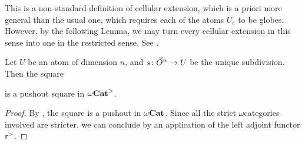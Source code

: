 \begin{comm}
    This is a non-standard definition of cellular extension, which is a priori more general than the usual one, which requires each of the atoms \( U_e \) to be globes.
    However, by the following Lemma, we may turn every cellular extension in this sense into one in the restricted sense. 
    See \cite[Comment 8.2.2]{hadzihasanovic2024combinatorics}. 
\end{comm}

\begin{lem} \label{lem:pushout_principal_cell} 
    Let \( U \) be an atom of dimension \( n \), and \( s \colon \vec{O}^{n} \to U \) be the unique subdivision.
    Then the square
    \begin{center}
    \end{center}
    is a pushout square in \( {\omega\mathbf{Cat}}^> \).
\end{lem}
\begin{proof}
    By \cite[Lemma 9.1.12]{hadzihasanovic2024combinatorics}, the square is a pushout in \( {\omega\mathbf{Cat}} \).
    Since all the strict \( \omega \)\nbd categories involved are stricter, we can conclude by an application of the left adjoint functor \( \mathsf{r}^{>} \). 
\end{proof}

